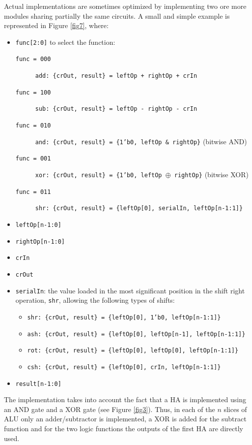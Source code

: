 Actual implementations are sometimes optimized by implementing two ore more modules sharing partially the same circuits. A small and simple example is represented in Figure \ref{fig7}, where: {\small
\begin{itemize}
\item {\tt func[2:0]} to select the function:
    \begin{description}
        \item[{\tt func = 000}] {\tt add: \{crOut, result\} = leftOp + rightOp + crIn}
        \item[{\tt func = 100}] {\tt sub: \{crOut, result\} = leftOp - rightOp - crIn}
        \item[{\tt func = 010}] {\tt and: \{crOut, result\} = \{1'b0, leftOp \& rightOp\}} (bitwise AND)
        \item[{\tt func = 001}] {\tt xor: \{crOut, result\} = \{1'b0, leftOp $\oplus$ rightOp\}} (bitwise XOR)
        \item[{\tt func = 011}] {\tt shr: \{crOut, result\} = \{leftOp[0], serialIn, leftOp[n-1:1]\}}
    \end{description}
\item {\tt leftOp[n-1:0]}
\item {\tt rightOp[n-1:0]}
\item {\tt crIn}
\item {\tt crOut}
\item {\tt serialIn}: the value loaded in the most significant position in the shift right operation, {\tt shr}, allowing the following types of shifts:
    \begin{itemize}
        \item {\tt shr: \{crOut, result\} = \{leftOp[0], 1'b0, leftOp[n-1:1]\}}
        \item {\tt ash: \{crOut, result\} = \{leftOp[0], leftOp[n-1], leftOp[n-1:1]\}}
        \item {\tt rot: \{crOut, result\} = \{leftOp[0], leftOp[0], leftOp[n-1:1]\}}
        \item {\tt csh: \{crOut, result\} = \{leftOp[0], crIn, leftOp[n-1:1]\}}
    \end{itemize}
\item {\tt result[n-1:0]}
\end{itemize}
}


The implementation takes into account the fact that a HA is implemented using an AND gate and a XOR gate (see Figure \ref{fig3}). Thus, in each of the $n$ slices of ALU only an adder/subtractor is implemented, a XOR is added for the subtract function and for the two logic functions the outputs of the first HA are directly used.

